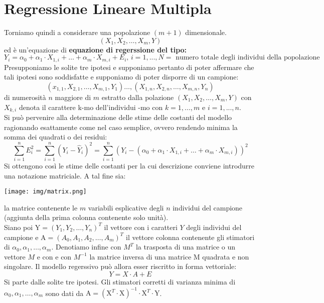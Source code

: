 \documentclass[a4paper,12pt, oneside]{book}
\begin{document}
\chapter{Regressione Lineare Multipla }
Torniamo quindi a considerare una popolazione $(m+1)$ dimensionale.
\[\left(X_{1}, X_{2}, \ldots, X_{m}, Y\right)\]
ed è un'equazione di \textbf{equazione di regerssione del tipo:}
\[Y_{i}=\alpha_{0}+\alpha_{1} \cdot X_{1, i}+\ldots+\alpha_{m} \cdot X_{m, i}+E_{i},\, i=1,...,N=\text{ numero totale degli individui della popolazione}\]
Presupponiamo le solite tre ipotesi e supponiamo pertanto di poter affermare che tali ipotesi sono soddisfatte e
supponiamo di poter disporre di un campione:
\[\left(x_{1,1}, X_{2,1}, \ldots, X_{m, 1}, Y_{1}\right) \ldots,\left(X_{1, n}, X_{2, n}, \ldots, X_{m, n}, Y_{n}\right)\]
di numerosità $n$ maggiore di $m$ estratto dalla polazione $\left(X_{1}, X_{2}, \ldots, X_{m}, Y\right)$ con $X_{k,i}$ denota il carattere k-mo dell'individui -mo con $k=1,...,m$ e $i=1,...,n$.\\
Si può pervenire alla determinazione delle stime delle costanti del modello ragionando
esattamente come nel caso semplice, ovvero rendendo minima la somma dei quadrati
o dei residui:
\[\sum_{i=1}^{n} E_{i}^{2}=\sum_{i=1}^{n}\left(Y_{i}-\hat{Y}_{i}\right)^{2}=\sum_{i=1}^{n}\left(Y_{i}-\left(\alpha_{0}+\alpha_{1} \cdot X_{1, i}+\ldots+\alpha_{m} \cdot X_{m, i}\right)\right)^{2}\]
Si ottengono così le stime delle costanti per la cui descrizione conviene introdurre una
notazione matriciale. A tal fine sia:
\begin{center}
\texttt{[image: img/matrix.png]}
\end{center}
la matrice contenente le $m$ variabili esplicative degli $n$ individui del campione
(aggiunta della prima colonna contenente solo unità).\\
Siano poi $\mathrm{Y}=\left(Y_{1}, Y_{2}, \ldots, Y_{n}\right)^{T}$ il vettore con i caratteri $Y$ degli individui del campione e $\mathrm{A}=\left(A_{0}, A_{1}, A_{2}, \ldots, A_{m}\right)^{T}$ il vettore colonna contenente gli stimatori di $\alpha_{0}, \alpha_{1}, \ldots, \alpha_{m}$. Denotiamo infine con $M^T$ la trasposta di una matrice o un vettore $M$ e con e con $M^{-1}$ la matrice inversa di una matrice M quadrata e non singolare.
Il modello regerssivo può allora esser riscritto in forma vettoriale:
\[Y=X\cdot A+E\]
Si parte dalle solite tre ipotesi. Gli stimatori corretti di varianza minima di $\alpha_{0}, \alpha_{1}, \dots, \alpha_{m}$ sono dati da $\mathrm{A}=\left(\mathrm{X}^{T} \cdot \mathrm{X}\right)^{-1} \cdot \mathrm{X}^{T} \cdot \mathrm{Y}$.\\
\end{document}
